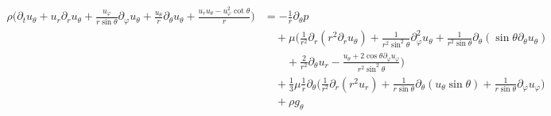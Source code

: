 $$
\begin{aligned}
\rho \Big(
\partial_t u_\theta
+ u_r \partial_r u_\theta
+ \frac{u_\varphi}{r \sin\theta} \partial_\varphi u_\theta
+ \frac{u_\theta}{r} \partial_\theta u_\theta
+ \frac{u_r u_\theta - u_\varphi^2 \cot\theta}{r}
\Big)
&= -\frac{1}{r} \partial_\theta p \\[6pt]
&\quad + \mu \Big(
\frac{1}{r^2} \partial_r (r^2 \partial_r u_\theta)
+ \frac{1}{r^2 \sin^2\theta} \partial_\varphi^2 u_\theta
+ \frac{1}{r^2 \sin\theta} \partial_\theta (\sin\theta \partial_\theta u_\theta) \\
&\qquad + \frac{2}{r^2} \partial_\theta u_r
- \frac{u_\theta + 2 \cos\theta \partial_\varphi u_\varphi}{r^2 \sin^2\theta}
\Big) \\[6pt]
&\quad + \frac{1}{3}\mu \frac{1}{r} \partial_\theta \Big(
\frac{1}{r^2} \partial_r (r^2 u_r)
+ \frac{1}{r \sin\theta} \partial_\theta (u_\theta \sin\theta)
+ \frac{1}{r \sin\theta} \partial_\varphi u_\varphi
\Big) \\
&\quad + \rho g_\theta
\end{aligned}~
$$

